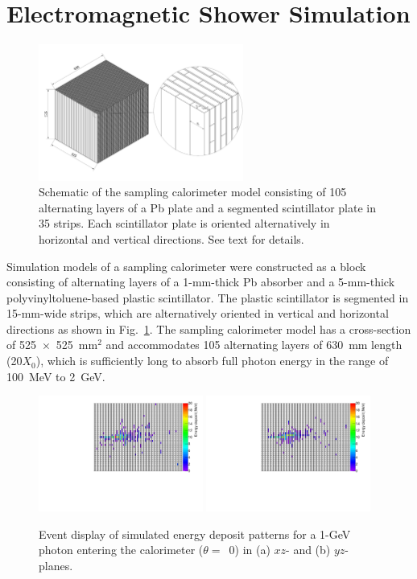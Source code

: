 \documentclass[preprint,12pt,times,a4paper]{elsarticle}
\begin{document}
\section{Electromagnetic Shower Simulation}
\label{sec:ems}

\begin{figure}[!hbt]
\centering
\includegraphics[width=0.6\textwidth]{figures/Fig1_detector_schematic.jpeg}
\caption{ Schematic of the sampling calorimeter model consisting of 105 alternating layers of a Pb plate and a segmented scintillator plate in 35 strips. Each scintillator plate is oriented alternatively in horizontal and vertical directions. See text for details. }
\label{fig:det_conf}
\end{figure}

Simulation models of a sampling calorimeter were constructed as a block consisting of alternating layers of a 1-mm-thick Pb absorber and a 5-mm-thick polyvinyltoluene-based plastic scintillator. The plastic scintillator is segmented in 15-mm-wide strips, which are alternatively oriented in vertical and horizontal directions as shown in Fig.~\ref{fig:det_conf}. The sampling calorimeter model has a cross-section of 525~$\times$~525~mm$^{2}$ and accommodates 105 alternating layers of 630~mm length (20$X_{0}$), which is sufficiently long to absorb full photon energy in the range of 100~MeV to 2~GeV. 

\begin{figure}[!hbt]
\centering
\includegraphics[width=0.48\textwidth]{figures/Fig2_EMShower_XZ.pdf}
\includegraphics[width=0.48\textwidth]{figures/Fig2_EMShower_YZ.pdf}
\caption{ Event display of simulated energy deposit patterns for a 1-GeV photon entering the calorimeter ($\theta=$~0) in (a) $xz$- and (b) $yz$-planes.}
\label{fig:Evt_Dis}
\end{figure}
\end{document}
